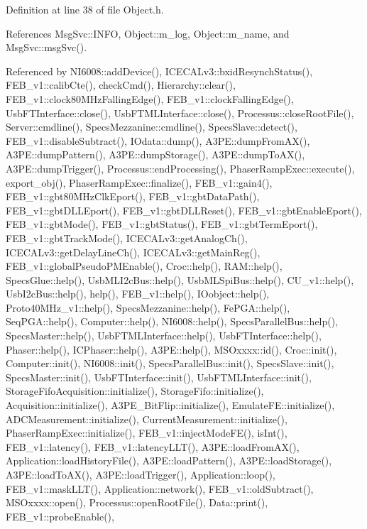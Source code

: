 Definition at line 38 of file Object.\+h.



References Msg\+Svc\+::\+I\+N\+FO, Object\+::m\+\_\+log, Object\+::m\+\_\+name, and Msg\+Svc\+::msg\+Svc().



Referenced by N\+I6008\+::add\+Device(), I\+C\+E\+C\+A\+Lv3\+::bxid\+Resynch\+Status(), F\+E\+B\+\_\+v1\+::calib\+Cte(), check\+Cmd(), Hierarchy\+::clear(), F\+E\+B\+\_\+v1\+::clock80\+M\+Hz\+Falling\+Edge(), F\+E\+B\+\_\+v1\+::clock\+Falling\+Edge(), Usb\+F\+T\+Interface\+::close(), Usb\+F\+T\+M\+L\+Interface\+::close(), Processus\+::close\+Root\+File(), Server\+::cmdline(), Specs\+Mezzanine\+::cmdline(), Specs\+Slave\+::detect(), F\+E\+B\+\_\+v1\+::disable\+Subtract(), I\+Odata\+::dump(), A3\+P\+E\+::dump\+From\+A\+X(), A3\+P\+E\+::dump\+Pattern(), A3\+P\+E\+::dump\+Storage(), A3\+P\+E\+::dump\+To\+A\+X(), A3\+P\+E\+::dump\+Trigger(), Processus\+::end\+Processing(), Phaser\+Ramp\+Exec\+::execute(), export\+\_\+obj(), Phaser\+Ramp\+Exec\+::finalize(), F\+E\+B\+\_\+v1\+::gain4(), F\+E\+B\+\_\+v1\+::gbt80\+M\+Hz\+Clk\+Eport(), F\+E\+B\+\_\+v1\+::gbt\+Data\+Path(), F\+E\+B\+\_\+v1\+::gbt\+D\+L\+L\+Eport(), F\+E\+B\+\_\+v1\+::gbt\+D\+L\+L\+Reset(), F\+E\+B\+\_\+v1\+::gbt\+Enable\+Eport(), F\+E\+B\+\_\+v1\+::gbt\+Mode(), F\+E\+B\+\_\+v1\+::gbt\+Status(), F\+E\+B\+\_\+v1\+::gbt\+Term\+Eport(), F\+E\+B\+\_\+v1\+::gbt\+Track\+Mode(), I\+C\+E\+C\+A\+Lv3\+::get\+Analog\+Ch(), I\+C\+E\+C\+A\+Lv3\+::get\+Delay\+Line\+Ch(), I\+C\+E\+C\+A\+Lv3\+::get\+Main\+Reg(), F\+E\+B\+\_\+v1\+::global\+Pseudo\+P\+M\+Enable(), Croc\+::help(), R\+A\+M\+::help(), Specs\+Glue\+::help(), Usb\+M\+L\+I2c\+Bus\+::help(), Usb\+M\+L\+Spi\+Bus\+::help(), C\+U\+\_\+v1\+::help(), Usb\+I2c\+Bus\+::help(), help(), F\+E\+B\+\_\+v1\+::help(), I\+Oobject\+::help(), Proto40\+M\+Hz\+\_\+v1\+::help(), Specs\+Mezzanine\+::help(), Fe\+P\+G\+A\+::help(), Seq\+P\+G\+A\+::help(), Computer\+::help(), N\+I6008\+::help(), Specs\+Parallel\+Bus\+::help(), Specs\+Master\+::help(), Usb\+F\+T\+M\+L\+Interface\+::help(), Usb\+F\+T\+Interface\+::help(), Phaser\+::help(), I\+C\+Phaser\+::help(), A3\+P\+E\+::help(), M\+S\+Oxxxx\+::id(), Croc\+::init(), Computer\+::init(), N\+I6008\+::init(), Specs\+Parallel\+Bus\+::init(), Specs\+Slave\+::init(), Specs\+Master\+::init(), Usb\+F\+T\+Interface\+::init(), Usb\+F\+T\+M\+L\+Interface\+::init(), Storage\+Fifo\+Acquisition\+::initialize(), Storage\+Fifo\+::initialize(), Acquisition\+::initialize(), A3\+P\+E\+\_\+\+Bit\+Flip\+::initialize(), Emulate\+F\+E\+::initialize(), A\+D\+C\+Measurement\+::initialize(), Current\+Measurement\+::initialize(), Phaser\+Ramp\+Exec\+::initialize(), F\+E\+B\+\_\+v1\+::inject\+Mode\+F\+E(), is\+Int(), F\+E\+B\+\_\+v1\+::latency(), F\+E\+B\+\_\+v1\+::latency\+L\+L\+T(), A3\+P\+E\+::load\+From\+A\+X(), Application\+::load\+History\+File(), A3\+P\+E\+::load\+Pattern(), A3\+P\+E\+::load\+Storage(), A3\+P\+E\+::load\+To\+A\+X(), A3\+P\+E\+::load\+Trigger(), Application\+::loop(), F\+E\+B\+\_\+v1\+::mask\+L\+L\+T(), Application\+::network(), F\+E\+B\+\_\+v1\+::old\+Subtract(), M\+S\+Oxxxx\+::open(), Processus\+::open\+Root\+File(), Data\+::print(), F\+E\+B\+\_\+v1\+::probe\+Enable(), 